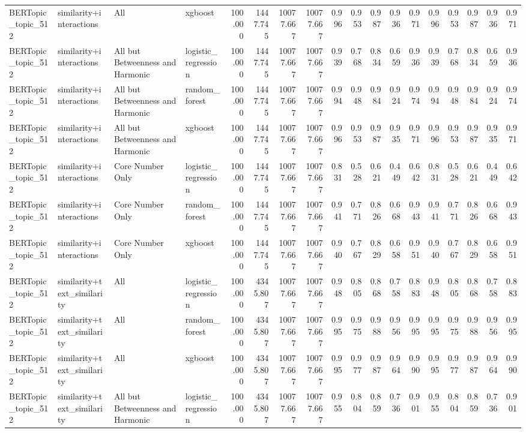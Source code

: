\begin{tabular}{llllrrrrrrrrrrrrrr}
BERTopic_topic_512 & similarity+interactions & All & xgboost & 100.000 & 1447.745 & 10077.667 & 10077.667 & 0.996 & 0.953 & 0.987 & 0.936 & 0.971 & 0.996 & 0.953 & 0.987 & 0.936 & 0.971 \\
BERTopic_topic_512 & similarity+interactions & All but Betweenness and Harmonic & logistic_regression & 100.000 & 1447.745 & 10077.667 & 10077.667 & 0.939 & 0.768 & 0.834 & 0.659 & 0.936 & 0.939 & 0.768 & 0.834 & 0.659 & 0.936 \\
BERTopic_topic_512 & similarity+interactions & All but Betweenness and Harmonic & random_forest & 100.000 & 1447.745 & 10077.667 & 10077.667 & 0.994 & 0.948 & 0.984 & 0.924 & 0.974 & 0.994 & 0.948 & 0.984 & 0.924 & 0.974 \\
BERTopic_topic_512 & similarity+interactions & All but Betweenness and Harmonic & xgboost & 100.000 & 1447.745 & 10077.667 & 10077.667 & 0.996 & 0.953 & 0.987 & 0.935 & 0.971 & 0.996 & 0.953 & 0.987 & 0.935 & 0.971 \\
BERTopic_topic_512 & similarity+interactions & Core Number Only & logistic_regression & 100.000 & 1447.745 & 10077.667 & 10077.667 & 0.831 & 0.528 & 0.621 & 0.449 & 0.642 & 0.831 & 0.528 & 0.621 & 0.449 & 0.642 \\
BERTopic_topic_512 & similarity+interactions & Core Number Only & random_forest & 100.000 & 1447.745 & 10077.667 & 10077.667 & 0.941 & 0.771 & 0.826 & 0.668 & 0.943 & 0.941 & 0.771 & 0.826 & 0.668 & 0.943 \\
BERTopic_topic_512 & similarity+interactions & Core Number Only & xgboost & 100.000 & 1447.745 & 10077.667 & 10077.667 & 0.940 & 0.767 & 0.829 & 0.658 & 0.951 & 0.940 & 0.767 & 0.829 & 0.658 & 0.951 \\
BERTopic_topic_512 & similarity+text_similarity & All & logistic_regression & 100.000 & 4345.807 & 10077.667 & 10077.667 & 0.948 & 0.805 & 0.868 & 0.758 & 0.883 & 0.948 & 0.805 & 0.868 & 0.758 & 0.883 \\
BERTopic_topic_512 & similarity+text_similarity & All & random_forest & 100.000 & 4345.807 & 10077.667 & 10077.667 & 0.995 & 0.975 & 0.988 & 0.956 & 0.995 & 0.995 & 0.975 & 0.988 & 0.956 & 0.995 \\
BERTopic_topic_512 & similarity+text_similarity & All & xgboost & 100.000 & 4345.807 & 10077.667 & 10077.667 & 0.995 & 0.977 & 0.987 & 0.964 & 0.990 & 0.995 & 0.977 & 0.987 & 0.964 & 0.990 \\
BERTopic_topic_512 & similarity+text_similarity & All but Betweenness and Harmonic & logistic_regression & 100.000 & 4345.807 & 10077.667 & 10077.667 & 0.955 & 0.804 & 0.859 & 0.736 & 0.901 & 0.955 & 0.804 & 0.859 & 0.736 & 0.901 \\

\end{tabular}

